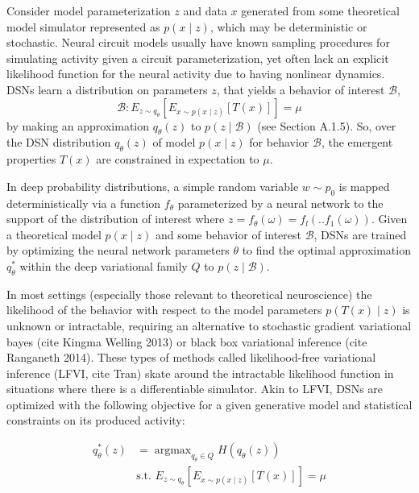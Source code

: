 \documentclass[11pt]{article}
\DeclareMathOperator*{\argmax}{argmax}
\begin{document}
Consider model parameterization $z$ and data $x$ generated from some theoretical model simulator represented as $p(x \mid z)$, which may be deterministic or stochastic.  Neural circuit models usually have known sampling procedures for simulating activity given a circuit parameterization, yet often lack an explicit likelihood function for the neural activity due to having nonlinear dynamics. DSNs learn a distribution on parameters $z$, that yields a behavior of interest $\mathcal{B}$,
\begin{equation}
\mathcal{B}: E_{z \sim q_\theta}\left[ E_{x\sim p(x \mid z)}\left[T(x)\right] \right] = \mu
\end{equation}
by making an approximation $q_\theta(z)$ to $p(z \mid \mathcal{B})$ (see Section A.1.5).  So, over the DSN distribution $q_\theta(z)$ of model $p(x \mid z)$ for behavior $\mathcal{B}$, the emergent properties $T(x)$ are constrained in expectation to $\mu$.

 In deep probability distributions, a simple random variable $w \sim p_0$ is mapped deterministically via a function $f_\theta$ parameterized by a neural network to the support of the distribution of interest where $z = f_{\theta}(\omega) = f_l(..f_1(\omega))$.  Given a theoretical model $p(x \mid z)$ and some behavior of interest $\mathcal{B}$, DSNs are trained by optimizing the neural network parameters $\theta$ to find the optimal approximation $q_{\theta}^*$ within the deep variational family $Q$ to $p(z \mid \mathcal{B})$.

In most settings (especially those relevant to theoretical neuroscience) the likelihood of the behavior with respect to the model parameters $p(T(x) \mid z)$ is unknown or intractable, requiring an alternative to stochastic gradient variational bayes (cite Kingma Welling 2013) or black box variational inference (cite Ranganeth 2014).  These types of methods called likelihood-free variational inference (LFVI, cite Tran) skate around the intractable likelihood function in situations where there is a differentiable simulator. Akin to LFVI, DSNs are optimized with the following objective for a given generative model and statistical constraints on its produced activity:

\begin{equation}
\begin{split}
q_\theta^*(z) &= \argmax_{q_\theta \in Q} H(q_\theta(z)) \\
 &  \text{s.t.  } E_{z \sim q_\theta}\left[ E_{x\sim p(x \mid z)}\left[T(x)\right] \right] = \mu \\
 \end{split}
\end{equation}
\end{document}
